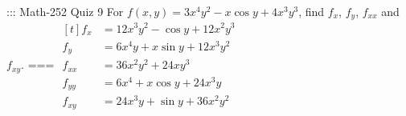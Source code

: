 ::: Math-252 Quiz 9
For \(f(x,y)=3x^4y^2-x\cos y+4x^3y^3\), find \(f_{x}\), \(f_{y}\),
\(f_{xx}\) and \(f_{xy}\).
===
\(\begin{aligned}[t]
  f_{x}&=12x^3y^2-\cos y+12x^2y^3\\
  f_{y}&=6x^4y+x\sin y+12x^3y^2\\
  f_{xx}&=36x^2y^2+24xy^3\\
  f_{yy}&=6x^4+x\cos y+24x^3y\\
  f_{xy}&=24x^3y+\sin y+36x^2y^2
\end{aligned}\)
